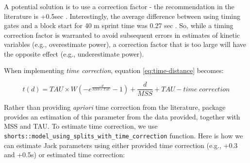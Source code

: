 \documentclass[
]{jss}
\begin{document}
A potential solution is to use a correction factor - the recommendation in the literature is +0.5sec \citep{haugenSprintMechanicalProperties2020, haugenSprintMechanicalVariables2019}. Interestingly, the average difference between using timing gates and a block start for 40 m sprint time was 0.27 sec \citep{haugenDifferenceStartImpact2012}. So, while a timing correction factor is warranted to avoid subsequent errors in estimates of kinetic variables (e.g., overestimate power), a correction factor that is too large will have the opposite effect (e.g., underestimate power).

When implementing \emph{time correction}, equation \eqref{eq:time-distance} becomes:

\begin{equation}
  t(d) = TAU \times W(-e^{\frac{-d}{MSS \times TAU}} - 1) + \frac{d}{MSS} + TAU - time \; correction \label{eq:time-correction}
\end{equation}

Rather than providing \emph{apriori} time correction from the literature,  package provides an estimation of this parameter from the data provided, together with MSS and TAU. To estimate time correction, we use \texttt{shorts::model\_using\_splits\_with\_time\_correction} function. Here is how we can estimate Jack parameters using either provided time correction (e.g., +0.3 and +0.5s) or estimated time correction:
\end{document}
